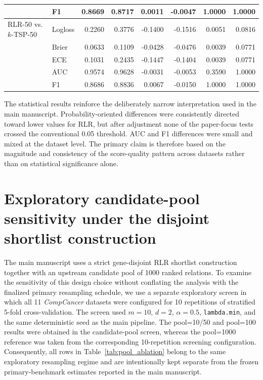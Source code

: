 \documentclass[11pt, a4paper]{article}
\begin{document}
\begin{table}[!htbp]
{\begin{tabular}{llrrrrrr}
 & F1 & 0.8669 & 0.8717 & 0.0011 & -0.0047 & 1.0000 & 1.0000 \\
\midrule
RLR-50 vs. $k$-TSP-50 & Logloss & 0.2260 & 0.3776 & -0.1400 & -0.1516 & 0.0051 & 0.0816 \\
 & Brier & 0.0633 & 0.1109 & -0.0428 & -0.0476 & 0.0039 & 0.0771 \\
 & ECE & 0.1031 & 0.2435 & -0.1447 & -0.1404 & 0.0039 & 0.0771 \\
 & AUC & 0.9574 & 0.9628 & -0.0031 & -0.0053 & 0.3590 & 1.0000 \\
 & F1 & 0.8686 & 0.8836 & 0.0067 & -0.0150 & 1.0000 & 1.0000 \\
\bottomrule
\end{tabular}
}
\end{table}

The statistical results reinforce the deliberately narrow interpretation used in the main manuscript. Probability-oriented differences were consistently directed toward lower values for RLR, but after adjustment none of the paper-focus tests crossed the conventional 0.05 threshold. AUC and F1 differences were small and mixed at the dataset level. The primary claim is therefore based on the magnitude and consistency of the score-quality pattern across datasets rather than on statistical significance alone.

\section{Exploratory candidate-pool sensitivity under the disjoint shortlist construction}
The main manuscript uses a strict gene-disjoint RLR shortlist construction together with an upstream candidate pool of 1000 ranked relations. To examine the sensitivity of this design choice without conflating the analysis with the finalized primary resampling schedule, we use a separate exploratory screen in which all 11 \emph{CompCancer} datasets were configured for 10 repetitions of stratified 5-fold cross-validation. The screen used $m=10$, $d=2$, $\alpha=0.5$, \texttt{lambda.min}, and the same deterministic seed as the main pipeline. The pool=10/50 and pool=100 results were obtained in the candidate-pool screen, whereas the pool=1000 reference was taken from the corresponding 10-repetition screening configuration. Consequently, all rows in Table~\ref{tab:pool_ablation} belong to the same exploratory resampling regime and are intentionally kept separate from the frozen primary-benchmark estimates reported in the main manuscript.
\end{document}
